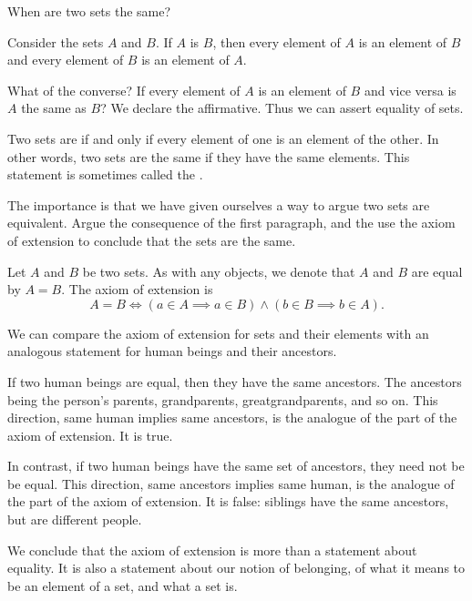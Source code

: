 
\sbasic




\sstart
{}


When are two
sets the same?


Consider the sets
$A$ and $B$.
If $A$ is $B$,
then every element of
$A$ is an element of
$B$ and every element
of $B$ is an element of
$A$.

What of the converse?
If every element of $A$
is an element of $B$
and vice versa is $A$
the same as $B$?
We declare the affirmative.
Thus we can assert equality
of sets.

Two sets are
if and only
if every element of one
is an element of the other.
In other words, two sets are
the same if they have the same
elements.
This statement
is sometimes called the
.

The importance is that we have
given ourselves a way to argue
two sets are equivalent. Argue
the consequence of the first
paragraph, and the use the
axiom of extension to conclude
that the sets are the same.


Let $A$ and $B$ be
two sets.
As with any objects,
we denote that
$A$ and $B$
are equal
by $A = B$.
The axiom of extension is
\[
  A = B \Leftrightarrow (a \in A \implies a \in B) \land (b \in B \implies b \in A).
\]


We can compare the axiom of extension
for sets and their elements with an
analogous statement
for human beings and their ancestors.

If two human beings are equal,
then they have the same ancestors.
The ancestors being the person's parents,
grandparents, greatgrandparents,
and so on.
This direction, same human implies
same ancestors, is the analogue of
the  part of the axiom
of extension.
It is true.

In contrast, if two human beings have
the same set of ancestors, they need not be
be equal.
This direction, same ancestors implies
same human, is the analogue of the
 part of the axiom
of extension.
It is false:
siblings have the same ancestors,
but are different people.

We conclude that the axiom of extension
is more than a statement about equality.
It is also a statement about our notion of
belonging, of what it means
to be an element of a set, and what a set is.
\strats
